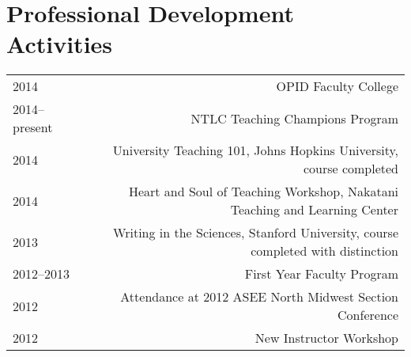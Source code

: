 \section*{Professional Development Activities}
\begin{tabular}{L!{\VRule}R}
2014&OPID Faculty College\\
2014--present&NTLC Teaching Champions Program\\
2014&University Teaching 101, Johns Hopkins University, course completed\\
2014&Heart and Soul of Teaching Workshop, Nakatani Teaching and Learning Center\\
2013&Writing in the Sciences, Stanford University, course completed with distinction\\
2012--2013&First Year Faculty Program\\
2012&Attendance at 2012 ASEE North Midwest Section Conference\\
2012&New Instructor Workshop\\
\end{tabular}